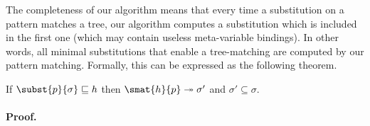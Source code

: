
The completeness of our algorithm means that every time a substitution
on a pattern matches a tree, our algorithm computes a substitution
which is included in the first one (which may contain useless
meta\hyp{}variable bindings). In other words, all minimal
substitutions that enable a tree\hyp{}matching are computed by our
pattern matching. Formally, this can be expressed as the following
theorem.
\begin{theorem}[Completeness]\hfill
\begin{center}
If   \(\subst{{p}}{\sigma} \sqsubseteq h\)
then \(\smat{h}{{p}} \twoheadrightarrow \sigma'\) 
and  \(\sigma' \subseteq \sigma\).
\end{center}
\end{theorem}


\paragraph{Proof.}

